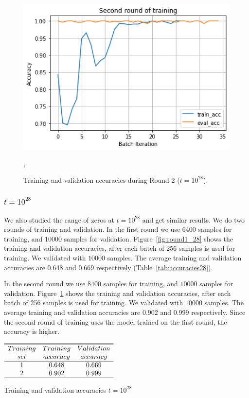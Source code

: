 \documentclass[twoside]{article}
\begin{document}
\begin{figure}
\includegraphics[width=1.0\textwidth]{Round2_28.png}
\caption[]{ 
 Training and validation accuracies during Round 2 ($t=10^{28}$).
 }
\vspace{1mm}, 
\label{fig:round2_28}
\end{figure}

\subsubsection{\label{10E28} $t=10^{28}$}

We also studied the range of zeros at $t=10^{28}$ and get similar results. We  do two rounds of training and validation. In the first round we use $6400$ samples for training, and $10000$ samples for validation. Figure~\ref{fig:round1_28} shows the training and validation accuracies, after each batch of 256 samples is used for training.  We validated with $10000$ samples. The average training and validation accuracies are $0.648$ and $0.669$ respectively (Table~\ref{tab:accuracies28}).

In the second round we use $8400$ samples for training, and $10000$ samples for validation. Figure~\ref{fig:round2_28} shows the training and validation accuracies, after each batch of 256 samples is used for training.  We validated with $10000$ samples. The average training and validation accuracies are $0.902$ and $0.999$ respectively. Since the second round of training uses the model trained on the first round, the accuracy is higher.


\begin{table}
\centering \(\begin{array}{ccc}
\hline
\hline
Training  & Training &Validation  \\
set     &accuracy&accuracy\\
\hline
1  & 0.648 & 0.669 \\

2  & 0.902 & 0.999 \\
\hline
\end{array}\)
\caption{Training and validation accuracies $t=10^{28}$}
\label{tab:accuracies28}
\end{table}
\end{document}
